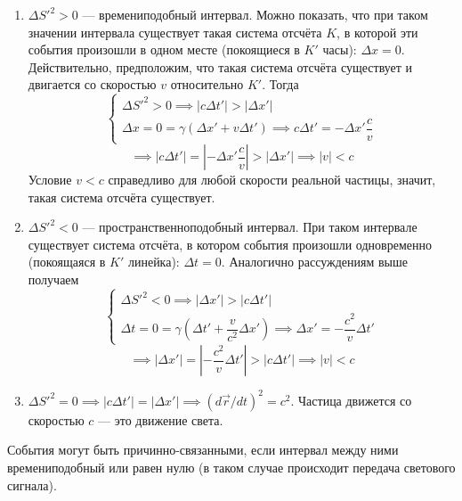 \documentclass{article}
\begin{document}
\begin{enumerate}
    \item $\Delta S'^2 > 0$ --- времениподобный интервал. Можно показать, что при таком значении интервала существует такая система отсчёта $K$, в которой эти события произошли в одном месте (покоящиеся в $K'$ часы): $\Delta x=0$. Действительно, предположим, что такая система отсчёта существует и двигается со скоростью $v$ относительно $K'$. Тогда
    \begin{equation*}
        \begin{cases}
        \Delta S'^2 > 0 \implies |c\Delta t'| > |\Delta x'|\\
        \Delta x=0=\gamma\left(\Delta x'+v\Delta t'\right) \implies c\Delta t'=-\Delta x'\dfrac{c}{v}
        \end{cases}
    \end{equation*}
    \begin{equation*}
        \implies |c\Delta t'|=|-\Delta x'\frac{c}{v}|>|\Delta x'| \implies |v|<c
    \end{equation*}
    Условие $v<c$ справедливо для любой скорости реальной частицы, значит, такая система отсчёта существует.
    \item $\Delta S'^2 < 0$ --- пространственноподобный интервал. При таком интервале существует система отсчёта, в котором события произошли одновременно (покоящаяся в $K'$ линейка): $\Delta t=0$. Аналогично рассуждениям выше получаем
    \begin{equation*}
        \begin{cases}
        \Delta S'^2 < 0 \implies |\Delta x'|>|c\Delta t'|\\
        \Delta t=0=\gamma\left(\Delta t'+\dfrac{v}{c^2}\Delta x'\right) \implies \Delta x'=-\dfrac{c^2}{v}\Delta t'
        \end{cases}
    \end{equation*}
    \begin{equation*}
        \implies |\Delta x'|=|-\frac{c^2}{v}\Delta t'|>|c\Delta t'| \implies |v|<c
    \end{equation*}
    \item $\Delta S'^2 = 0 \implies |c\Delta t'|=|\Delta x'| \implies \left(d\vec{r}/dt\right)^2=c^2$. Частица движется со скоростью $c$ --- это движение света.
\end{enumerate}

События могут быть причинно-связанными, если интервал между ними времениподобный или равен нулю (в таком случае происходит передача светового сигнала).
\end{document}
